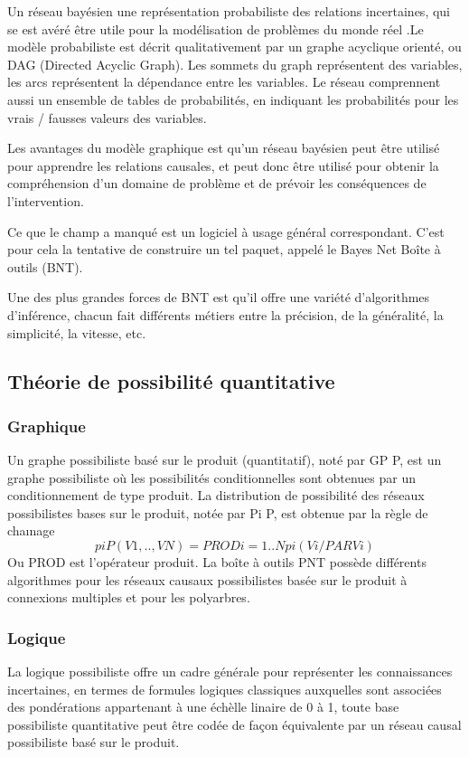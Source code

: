 Un réseau bayésien une représentation probabiliste des relations incertaines, qui se est avéré être utile pour la modélisation de problèmes du monde réel .Le modèle probabiliste est décrit qualitativement par un graphe acyclique orienté, ou DAG (Directed Acyclic Graph). Les sommets du graph représentent des variables, les arcs représentent la dépendance entre les variables. Le réseau comprennent aussi un ensemble de tables de probabilités, en indiquant les probabilités pour les vrais / fausses valeurs des variables.

Les avantages du  modèle graphique est qu’un réseau bayésien peut être utilisé pour apprendre les relations causales, et peut donc être utilisé pour obtenir la compréhension d'un domaine de problème et de prévoir les conséquences de l'intervention.

Ce que le champ a manqué est un logiciel à usage général correspondant. C’est pour cela la tentative de construire un tel paquet, appelé le Bayes Net Boîte à outils (BNT).

Une des plus grandes forces de BNT est qu'il offre une variété d'algorithmes d'inférence, chacun fait différents métiers entre la précision, de la généralité, la simplicité, la vitesse, etc.


\subsection{Théorie de possibilité quantitative}

\subsubsection{Graphique}

Un graphe possibiliste basé sur le produit (quantitatif), noté par GP P, est un graphe possibiliste où les possibilités conditionnelles sont obtenues par un conditionnement de type produit. La distribution de possibilité des réseaux possibilistes bases sur le produit, notée par Pi P, est obtenue par la règle de chaınage 
\begin{equation}
pi P (V1, .., VN) = PRODi=1..N pi (Vi/PARVi)
\end{equation}
Ou PROD est l’opérateur produit.
La boîte à outils PNT possède différents algorithmes pour les réseaux causaux possibilistes basée sur le produit à connexions multiples et pour les polyarbres. 
\subsubsection{Logique}
La logique possibiliste offre un cadre générale pour représenter les connaissances incertaines, en termes de formules logiques classiques auxquelles sont associées des pondérations appartenant à une échèlle linaire de 0 à 1, toute base possibiliste quantitative peut être codée de façon équivalente par un réseau causal possibiliste basé sur le produit.

